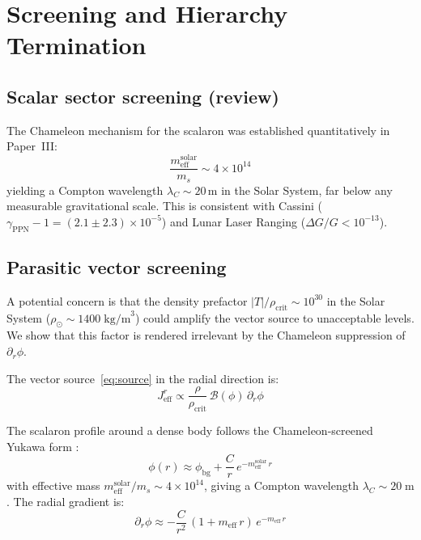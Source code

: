 \documentclass[aps,prd,twocolumn,superscriptaddress,nofootinbib]{revtex4-2}
\begin{document}
\section{Screening and Hierarchy Termination}
\label{sec:screening}

\subsection{Scalar sector screening (review)}

The Chameleon mechanism for the scalaron was established quantitatively in Paper~III:
\begin{equation}
\frac{m_{\mathrm{eff}}^{\mathrm{solar}}}{m_s} \sim 4 \times 10^{14}
\label{eq:meff_solar}
\end{equation}
yielding a Compton wavelength $\lambda_C \sim 20$\,m in the Solar System, far below any measurable gravitational scale. This is consistent with Cassini ($\gamma_{\mathrm{PPN}} - 1 = (2.1 \pm 2.3) \times 10^{-5}$) and Lunar Laser Ranging ($\Delta G/G < 10^{-13}$).

\subsection{Parasitic vector screening}
\label{sec:parasitic}

A potential concern is that the density prefactor $|T|/\rho_{\mathrm{crit}} \sim 10^{30}$ in the Solar System ($\rho_\odot \sim 1400\;\mathrm{kg/m}^3$) could amplify the vector source to unacceptable levels. We show that this factor is rendered irrelevant by the Chameleon suppression of $\partial_r\phi$.

The vector source~\eqref{eq:source} in the radial direction is:
\begin{equation}
J^r_{\mathrm{eff}} \propto \frac{\rho}{\rho_{\mathrm{crit}}}\,\mathcal{B}(\phi)\,\partial_r\phi
\end{equation}

The scalaron profile around a dense body follows the Chameleon-screened Yukawa form \cite{Geiger2026c}:
\begin{equation}
\phi(r) \approx \phi_{\mathrm{bg}} + \frac{C}{r}\,e^{-m_{\mathrm{eff}}^{\mathrm{solar}}\,r}
\end{equation}
with effective mass $m_{\mathrm{eff}}^{\mathrm{solar}}/m_s \sim 4 \times 10^{14}$, giving a Compton wavelength $\lambda_C \sim 20\;\mathrm{m}$. The radial gradient is:
\begin{equation}
\partial_r\phi \approx -\frac{C}{r^2}\,(1 + m_{\mathrm{eff}}\,r)\,e^{-m_{\mathrm{eff}}\,r}
\end{equation}
\end{document}
